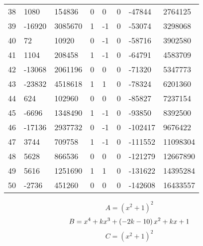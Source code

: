 \documentclass{amsart}
\begin{document}
\begin{longtable}{|l|l|l|lllll|}
38&1080&154836&0&0&0&-47844&2764125\\
39&-16920&3085670&1&-1&0&-53074&3298068\\
40&72&10920&0&-1&0&-58716&3902580\\
41&1104&208458&1&-1&0&-64791&4583709\\
42&-13068&2061196&0&0&0&-71320&5347773\\
43&-23832&4518618&1&1&0&-78324&6201360\\
44&624&102960&0&0&0&-85827&7237154\\
45&-6696&1348490&1&-1&0&-93850&8392500\\
46&-17136&2937732&0&-1&0&-102417&9676422\\
47&3744&709758&1&-1&0&-111552&11098304\\
48&5628&866536&0&0&0&-121279&12667890\\
49&5616&1251690&1&1&0&-131622&14395284\\
50&-2736&451260&0&0&0&-142608&16433557\\
\hline
\end{longtable}
$$A=(x^2
 + 1)^{2}$$
$$B=x^4
 + k\*x^3
 + \left(-2\*k
 - 10\right) \*x^2
 + k\*x
 + 1$$
$$C=(x^2
 + 1)^{2}$$
\end{document}

